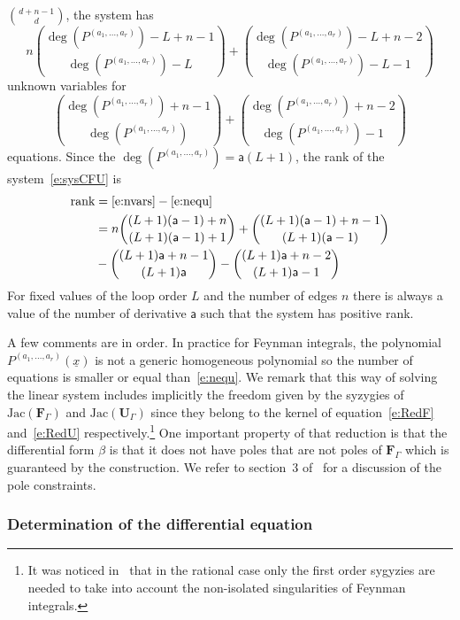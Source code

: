 \documentclass[a4paper,12pt]{article}
\numberwithin{equation}{section}
\numberwithin{figure}{section}
\begin{document}
$\binom{d+n-1}{d}$,  the system has
\begin{equation}\label{e:nvars}
n \binom{\deg( P^{(a_1,\dots,a_r)})-L+n-1}{\deg( P^{(a_1,\dots,a_r)})-L}+\binom{\deg( P^{(a_1,\dots,a_r)})-L+n-2}{\deg( P^{(a_1,\dots,a_r)})-L-1}
\end{equation} unknown variables for
\begin{equation}\label{e:nequ}
\binom{\deg( P^{(a_1,\dots,a_r)})+n-1}{\deg( P^{(a_1,\dots,a_r)})}+\binom{\deg( P^{(a_1,\dots,a_r)})+n-2}{\deg( P^{(a_1,\dots,a_r)})-1}
\end{equation}
equations.
%
%
Since the $\deg(P^{(a_1,\dots,a_r)})=\mathsf{a}(L+1)$, the rank of the system~\eqref{e:sysCFU} is
  \begin{align}
    \label{e:Rank}
    \textrm{rank}&=\eqref{e:nvars}-\eqref{e:nequ}\\
\nonumber    &=n \binom{(L+1)(\mathsf{a}-1)+n
               }{(L+1) (\mathsf{a}-1)+1}+\binom{(L+1)(\mathsf{a}-1)+n-1}{(L+1) (\mathsf{a}-1)}\cr
             \nonumber    &
                              -\binom{(L+1) \mathsf{a}+n-1}{(L+1) \mathsf{a}}-\binom{(L+1) \mathsf{a}+n-2}{(L+1) \mathsf{a}-1}
  \end{align}
For fixed values of the loop order $L$
and the number of edges $n$ there is always a value of the
number of derivative $\mathsf{a}$ such that the system has
positive rank.

A few comments are in order. In practice for Feynman integrals,   the polynomial $ P^{(a_1,\dots,a_r)}(\underline x)$ is not a generic
homogeneous polynomial so the number of equations is smaller or equal than~\eqref{e:nequ}.
%
We remark that this way of solving the linear system includes implicitly the
freedom given by the syzygies of $\textrm{Jac}(\textbf{F}_\Gamma)$ and
$\textrm{Jac}(\textbf{U}_\Gamma)$ since they belong to
the kernel of equation~\eqref{e:RedF} and~\eqref{e:RedU}
respectively.\footnote{It was noticed in~\cite{Lairez:2022zkj} that in
  the rational case only the first order sygyzies are needed to take
  into account the non-isolated singularities of Feynman integrals.}
%
%
%
One important property of that reduction is that the differential form $\beta$ is that it
does not have poles that are not poles of $\textbf{F}_\Gamma$ which is
guaranteed by the construction. We refer
to section~3 of~\cite{Lairez:2022zkj} for a discussion of the pole constraints.
%
%
\subsubsection{Determination of the differential equation}
\label{sec:deriv-diff-equat}
\end{document}

